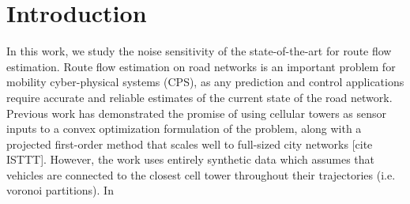 
\section{Introduction}
In this work, we study the noise sensitivity of the state-of-the-art for route flow estimation. Route flow estimation on road networks is an important problem for mobility cyber-physical systems (CPS), as any prediction and control applications require accurate and reliable estimates of the current state of the road network. Previous work has demonstrated the promise of using cellular towers as sensor inputs to a convex optimization formulation of the problem, along with a projected first-order method that scales well to full-sized city networks [cite ISTTT]. However, the work uses entirely synthetic data which assumes that vehicles are connected to the closest cell tower throughout their trajectories (i.e. voronoi partitions). In
